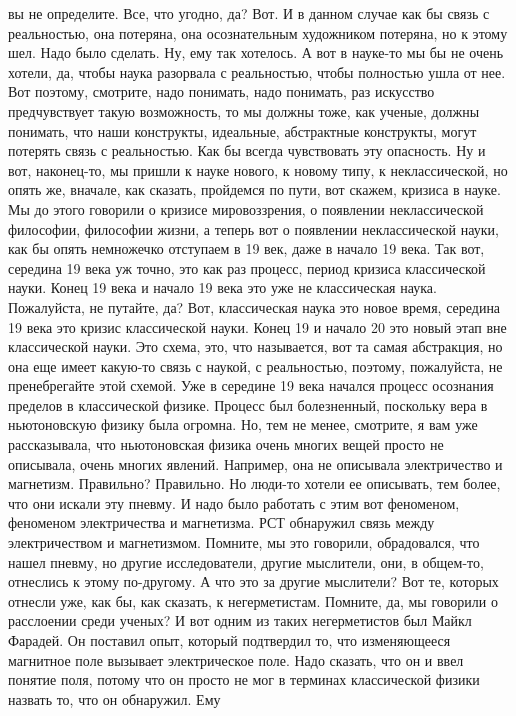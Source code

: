 вы не определите. Все, что угодно, да? Вот. И в данном случае как бы связь с
реальностью, она потеряна, она осознательным художником потеряна, но к этому
шел. Надо было сделать. Ну, ему так хотелось. А вот в науке-то мы бы не очень
хотели, да, чтобы наука разорвала с реальностью, чтобы полностью ушла от нее.
Вот поэтому, смотрите, надо понимать, надо понимать, раз искусство предчувствует
такую возможность, то мы должны тоже, как ученые, должны понимать, что наши
конструкты, идеальные, абстрактные конструкты, могут потерять связь с
реальностью. Как бы всегда чувствовать эту опасность. Ну и вот, наконец-то, мы
пришли к науке нового, к новому типу, к неклассической, но опять же, вначале,
как сказать, пройдемся по пути, вот скажем, кризиса в науке. Мы до этого
говорили о кризисе мировоззрения, о появлении неклассической философии,
философии жизни, а теперь вот о появлении неклассической науки, как бы опять
немножечко отступаем в 19 век, даже в начало 19 века. Так вот, середина 19 века
уж точно, это как раз процесс, период кризиса классической науки. Конец 19 века
и начало 19 века это уже не классическая наука. Пожалуйста, не путайте, да? Вот,
классическая наука это новое время, середина 19 века это кризис классической
науки. Конец 19 и начало 20 это новый этап вне классической науки. Это схема,
это, что называется, вот та самая абстракция, но она еще имеет какую-то связь с
наукой, с реальностью, поэтому, пожалуйста, не пренебрегайте этой схемой. Уже в
середине 19 века начался процесс осознания пределов в классической физике.
Процесс был болезненный, поскольку вера в ньютоновскую физику была огромна. Но,
тем не менее, смотрите, я вам уже рассказывала, что ньютоновская физика очень
многих вещей просто не описывала, очень многих явлений. Например, она не
описывала электричество и магнетизм. Правильно? Правильно. Но люди-то хотели ее
описывать, тем более, что они искали эту пневму. И надо было работать с этим вот
феноменом, феноменом электричества и магнетизма. РСТ обнаружил связь между
электричеством и магнетизмом. Помните, мы это говорили, обрадовался, что нашел
пневму, но другие исследователи, другие мыслители, они, в общем-то, отнеслись к
этому по-другому. А что это за другие мыслители? Вот те, которых отнесли уже,
как бы, как сказать, к негерметистам. Помните, да, мы говорили о расслоении
среди ученых? И вот одним из таких негерметистов был Майкл Фарадей. Он поставил
опыт, который подтвердил то, что изменяющееся магнитное поле вызывает
электрическое поле. Надо сказать, что он и ввел понятие поля, потому что он
просто не мог в терминах классической физики назвать то, что он обнаружил. Ему
